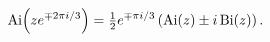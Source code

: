 \[\mathop{\mathrm{Ai}\/}\nolimits\!\left(ze^{\mp 2\pi i/3}\right)=\tfrac{1}{2}e^%
{\mp\pi i/3}\left(\mathop{\mathrm{Ai}\/}\nolimits\!\left(z\right)\pm i\mathop{%
\mathrm{Bi}\/}\nolimits\!\left(z\right)\right).\]